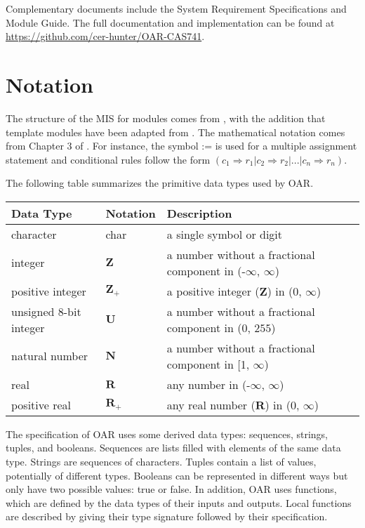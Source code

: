 \documentclass[12pt, titlepage]{article}
\begin{document}
Complementary documents include the System Requirement Specifications
and Module Guide.  The full documentation and implementation can be
found at \url{https://github.com/cer-hunter/OAR-CAS741}. 

\section{Notation}

The structure of the MIS for modules comes from \citet{HoffmanAndStrooper1995},
with the addition that template modules have been adapted from
\cite{GhezziEtAl2003}.  The mathematical notation comes from Chapter 3 of
\citet{HoffmanAndStrooper1995}.  For instance, the symbol := is used for a
multiple assignment statement and conditional rules follow the form $(c_1
\Rightarrow r_1 | c_2 \Rightarrow r_2 | ... | c_n \Rightarrow r_n )$.

The following table summarizes the primitive data types used by OAR. 

\begin{center}
\renewcommand{\arraystretch}{1.2}
\noindent 
\begin{tabular}{l l p{7.5cm}} 
\toprule 
\textbf{Data Type} & \textbf{Notation} & \textbf{Description}\\ 
\midrule
character & char & a single symbol or digit\\
integer & $\mathbf{Z}$ & a number without a fractional component in (-$\infty$, $\infty$) \\
positive integer & $\mathbf{Z}_{+}$ & a positive integer ($\mathbf{Z}$) in ($0$, $\infty$) \\
unsigned 8-bit integer & $\mathbf{U}$ & a number without a fractional component in ($0$, $255$) \\
natural number & $\mathbf{N}$ & a number without a fractional component in [1, $\infty$) \\
real & $\mathbf{R}$ & any number in (-$\infty$, $\infty$)\\
positive real & $\mathbf{R}_{+}$ & any real number ($\mathbf{R}$) in ($0$, $\infty$) \\
\bottomrule
\end{tabular} 
\end{center}

\noindent
The specification of OAR uses some derived data types: sequences, strings,
tuples, and booleans. Sequences are lists filled with elements of the same data type. Strings
are sequences of characters. Tuples contain a list of values, potentially of
different types. Booleans can be represented in different ways but only have two possible values: true or false. In addition, 
OAR uses functions, which
are defined by the data types of their inputs and outputs. Local functions are
described by giving their type signature followed by their specification.
\end{document}

